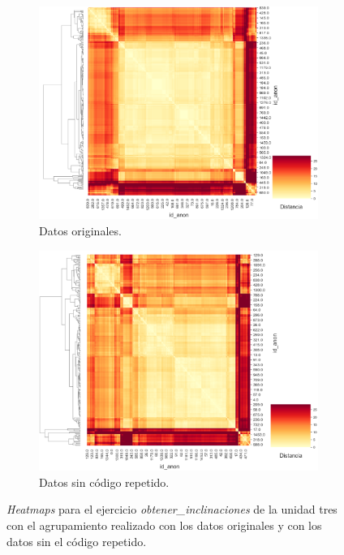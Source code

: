 \documentclass[11pt,a4paper,twoside,openany]{tesis}
\begin{document}
\begin{figure}[H]
    \centering
    \begin{subfigure}{0.45\textwidth}
        \includegraphics[width=\linewidth]{imagenes/codigo-reptido-original.png}
        \caption{Datos originales.}
        \label{fig:figura3}
    \end{subfigure}
    \hfill
    \begin{subfigure}{0.45\textwidth}
        \includegraphics[width=\linewidth]{imagenes/codigo-reptido-uniques.png}
        \caption{Datos sin código repetido.}
        \label{fig:figura4}
    \end{subfigure}
    \caption{\emph{Heatmaps} para el ejercicio \emph{obtener\_inclinaciones} de la unidad tres con el agrupamiento realizado con los datos originales y con los datos sin el código repetido.}
    \label{heatmaps_repetidos}
\end{figure}
\end{document}

